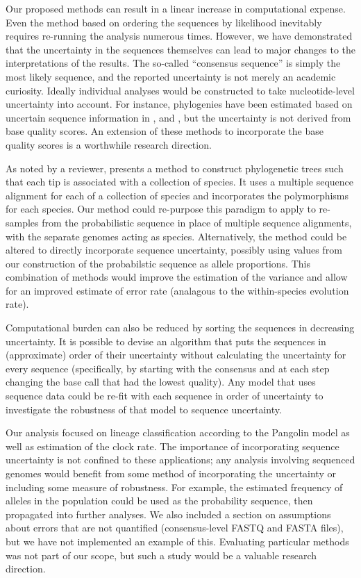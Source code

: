 \documentclass[12pt]{article}
\begin{document}
Our proposed methods can result in a linear increase in computational expense.
Even the method based on ordering the sequences by likelihood inevitably requires re-running the analysis numerous times.
However, we have demonstrated that the uncertainty in the sequences themselves can lead to major changes to the interpretations of the results.
The so-called ``consensus sequence'' is simply the most likely sequence, and the reported uncertainty is not merely an academic curiosity.
Ideally individual analyses would be constructed to take nucleotide-level uncertainty into account.
For instance, phylogenies have been estimated based on uncertain sequence information in \cite{rossOncoNEMInferringTumor2016}, \cite{jahnTreeInferenceSinglecell2016} and \cite{zafarSiFitInferringTumor2017}, but the uncertainty is not derived from base quality scores.
An extension of these methods to incorporate the base quality scores is a worthwhile research direction.

As noted by a reviewer, \citet{demaioLinkingGreatApes2013} presents a method to construct phylogenetic trees such that each tip is associated with a collection of species.
It uses a multiple sequence alignment for each of a collection of species and incorporates the polymorphisms for each species.
Our method could re-purpose this paradigm to apply to re-samples from the probabilistic sequence in place of multiple sequence alignments, with the separate genomes acting as species.
Alternatively, the method could be altered to directly incorporate sequence uncertainty, possibly using values from our construction of the probabilstic sequence as allele proportions.
This combination of methods would improve the estimation of the variance and allow for an improved estimate of error rate (analagous to the within-species evolution rate).

Computational burden can also be reduced by sorting the sequences in decreasing uncertainty.
It is possible to devise an algorithm that puts the sequences in (approximate) order of their uncertainty without calculating the uncertainty for every sequence (specifically, by starting with the consensus and at each step changing the base call that had the lowest quality).
Any model that uses sequence data could be re-fit with each sequence in order of uncertainty to investigate the robustness of that model to sequence uncertainty.

Our analysis focused on lineage classification according to the Pangolin model as well as estimation of the clock rate.
The importance of incorporating sequence uncertainty is not confined to these applications; any analysis involving sequenced genomes would benefit from some method of incorporating the uncertainty or including some measure of robustness.
For example, the estimated frequency of alleles in the population could be used as the probability sequence, then propagated into further analyses.
We also included a section on assumptions about errors that are not quantified (consensus-level FASTQ and FASTA files), but we have not implemented an example of this.
Evaluating particular methods was not part of our scope, but such a study would be a valuable research direction.
\end{document}

